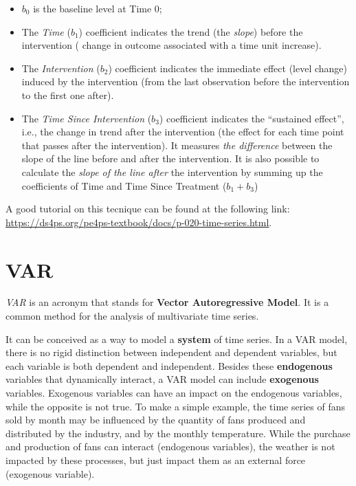 \documentclass[
]{article}
\providecommand{\tightlist}{%
  \setlength{\itemsep}{0pt}\setlength{\parskip}{0pt}}
\begin{document}
\begin{itemize}
\tightlist
\item
  \(b_0\) is the baseline level at Time 0;
\item
  The \emph{Time} (\(b_1\)) coefficient indicates the trend (the \emph{slope}) before the intervention ( change in outcome associated with a time unit increase).
\item
  The \emph{Intervention} (\(b_2\)) coefficient indicates the immediate effect (level change) induced by the intervention (from the last observation before the intervention to the first one after).
\item
  The \emph{Time Since Intervention} (\(b_3\)) coefficient indicates the ``sustained effect'', i.e., the change in trend after the intervention (the effect for each time point that passes after the intervention). It measures \emph{the difference} between the slope of the line before and after the intervention. It is also possible to calculate the \emph{slope of the line after} the intervention by summing up the coefficients of Time and Time Since Treatment (\(b_1 + b_3\))
\end{itemize}

A good tutorial on this tecnique can be found at the following link: \url{https://ds4ps.org/pe4ps-textbook/docs/p-020-time-series.html}.

\section{VAR}\label{var}

\emph{VAR} is an acronym that stands for \textbf{Vector Autoregressive Model}. It is a common method for the analysis of multivariate time series.

It can be conceived as a way to model a \textbf{system} of time series. In a VAR model, there is no rigid distinction between independent and dependent variables, but each variable is both dependent and independent. Besides these \textbf{endogenous} variables that dynamically interact, a VAR model can include \textbf{exogenous} variables. Exogenous variables can have an impact on the endogenous variables, while the opposite is not true. To make a simple example, the time series of fans sold by month may be influenced by the quantity of fans produced and distributed by the industry, and by the monthly temperature. While the purchase and production of fans can interact (endogenous variables), the weather is not impacted by these processes, but just impact them as an external force (exogenous variable).
\end{document}
